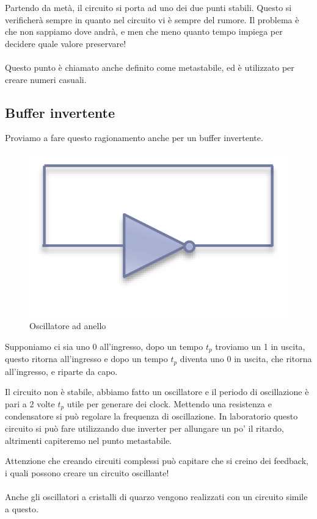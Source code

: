Partendo da metà, il circuito si porta ad uno dei due punti stabili. Questo si verificherà sempre in quanto nel circuito vi è sempre del rumore. Il problema è che non sappiamo dove andrà, e men che meno quanto tempo impiega per decidere quale valore preservare!

\paragraph{}

Questo punto è chiamato anche definito come metastabile, ed è utilizzato per creare numeri casuali.

\subsection{Buffer invertente}

Proviamo a fare questo ragionamento anche per un buffer invertente.

\begin{figure}[htbp]
    \centering
    \includegraphics[width=0.25\linewidth]{img/buf_invertente.png}
    \caption{Oscillatore ad anello}
    
\end{figure}

\newpage
Supponiamo ci sia uno 0 all'ingresso, dopo un tempo $t_p$ troviamo un 1 in uscita, questo ritorna all'ingresso e dopo un tempo $t_p$ diventa uno 0 in uscita, che ritorna all'ingresso, e riparte da capo.


Il circuito non è stabile, abbiamo fatto un oscillatore e il periodo di oscillazione è pari a 2 volte $t_p$ utile per generare dei clock. Mettendo una resistenza e condensatore si può regolare la frequenza di oscillazione. In laboratorio questo circuito si può fare utilizzando due inverter per allungare un po' il ritardo, altrimenti capiteremo  nel punto metastabile. 

Attenzione che creando circuiti complessi può capitare che si creino dei feedback, i quali possono creare un circuito oscillante!

\paragraph{}
Anche gli oscillatori a cristalli di quarzo vengono realizzati con un circuito simile a questo.

